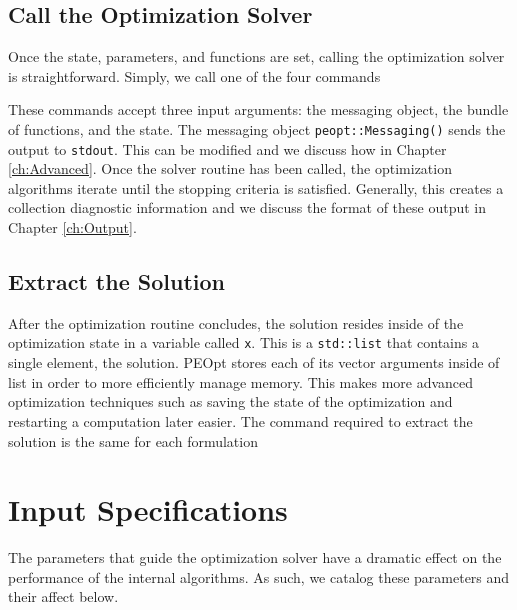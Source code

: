 \documentclass{report}
\begin{document}
\section{Call the Optimization Solver}

       Once the state, parameters, and functions are set, calling the optimization solver is straightforward.  Simply, we call one of the four commands

These commands accept three input arguments: the messaging object, the bundle of functions, and the state.  The messaging object \texttt{peopt::Messaging()} sends the output to \texttt{stdout}.  This can be modified and we discuss how in Chapter \ref{ch:Advanced}.  Once the solver routine has been called, the optimization algorithms iterate until the stopping criteria is satisfied.  Generally, this creates a collection diagnostic information and we discuss the format of these output in Chapter \ref{ch:Output}.

\section{Extract the Solution}

        After the optimization routine concludes, the solution resides inside of the optimization state in a variable called \texttt{x}.  This is a \texttt{std::list} that contains a single element, the solution.  PEOpt stores each of its vector arguments inside of list in order to more efficiently manage memory.  This makes more advanced optimization techniques such as saving the state of the optimization and restarting a computation later easier.  The command required to extract the solution is the same for each formulation


\chapter{Input Specifications}\label{ch:Input}

        The parameters that guide the optimization solver have a dramatic effect on the performance of the internal algorithms.  As such, we catalog these parameters and their affect below. 
\end{document}
